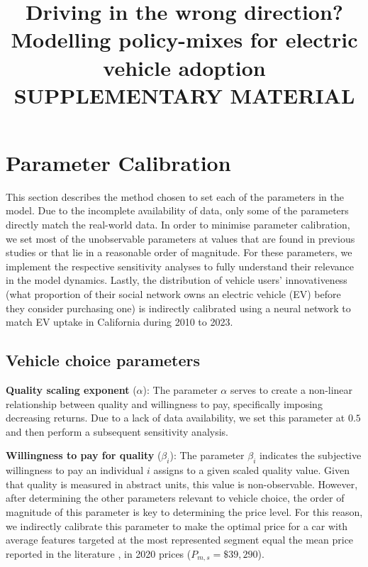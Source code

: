 \documentclass[12pt]{article}
\title{\vspace{-2.0cm}Driving in the wrong direction? Modelling policy-mixes for electric vehicle adoption\\\textbf{SUPPLEMENTARY MATERIAL}}
\date{}
\author{}
\begin{document}
	\maketitle
	
	\section{Parameter Calibration} \label{Appendix_Callibration}
	This section describes the method chosen to set each of the parameters in the model. Due to the incomplete availability of data, only some of the parameters directly match the real-world data. In order to minimise parameter calibration, we set most of the unobservable parameters at values that are found in previous studies or that lie in a reasonable order of magnitude. For these parameters, we implement the respective sensitivity analyses to fully understand their relevance in the model dynamics. Lastly, the distribution of vehicle users' innovativeness (what proportion of their social network owns an electric vehicle (EV) before they consider purchasing one) is indirectly calibrated using a neural network to match EV uptake in California during 2010 to 2023.   
	
	\subsection{Vehicle choice parameters} \label{Callibration_Consumer}
	
	\textbf{Quality scaling exponent} ($\alpha$): The parameter $\alpha$ serves to create a non-linear relationship between quality and willingness to pay, specifically imposing decreasing returns. Due to a lack of data availability, we set this parameter at $0.5$ and then perform a subsequent sensitivity analysis.
	
	\textbf{Willingness to pay for quality} ($\beta_i$): The parameter $\beta_i$ indicates the subjective willingness to pay an individual $i$ assigns to a given scaled quality value. Given that quality is measured in abstract units, this value is non-observable. However, after determining the other parameters relevant to vehicle choice, the order of magnitude of this parameter is key to determining the price level. For this reason, we indirectly calibrate this parameter to make the optimal price for a car with average features targeted at the most represented segment equal the mean price reported in the literature \citep{Grieco2024MarketPower}, in 2020 prices ($P_{m,s}=\$39,290$).
	
\end{document}
